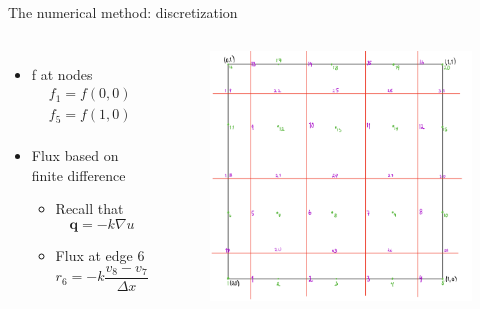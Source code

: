 \documentclass{beamer}
\begin{document}
    \begin{frame}{The numerical method: discretization}
        \begin{columns}
            \begin{itemize}
                \item f at nodes
                \begin{align*}
                    f_1 = f(0, 0) \\
                    f_5 = f(1, 0) \\
                \end{align*}
                \item Flux based on finite difference
                \begin{itemize}
                    \item Recall that
                    \begin{equation*}
                        \bm{q} = -k \nabla u
                    \end{equation*}
                    \item Flux at edge 6
                    \begin{equation*}
                        r_6 = -k \frac{v_8 - v_7}{\Delta x}
                    \end{equation*}
                \end{itemize} 
            \end{itemize}
            \begin{figure}
                \includegraphics[scale=0.24]{grid.png}
            \end{figure}
        \end{columns}
    \end{frame}
\end{document}
